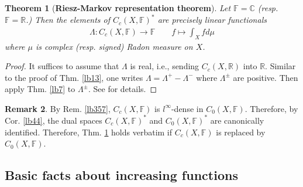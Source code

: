 \documentclass[12pt,b5paper,notitlepage]{article}
\theoremstyle{definition}
\newtheorem{df}{Definition}[subsection]
\newtheorem{rem}[df]{Remark}
\theoremstyle{plain}
\newtheorem{thm}[df]{Theorem}
\newcommand{\ovl}{\overline}
\newcommand{\Cbb}{\mathbb C}
\newcommand{\Rbb}{\mathbb R}
\newcommand{\Fbb}{\mathbb F}
\numberwithin{equation}{section}
\begin{document}
\begin{thm}[\textbf{Riesz-Markov representation theorem}] \label{lb8}
Let $\Fbb=\Cbb$ (resp. $\Fbb=\Rbb$.) Then the elements of $C_c(X,\Fbb)^*$ are precisely linear functionals
\begin{align*}
\Lambda:C_c(X,\Fbb)\rightarrow\Fbb \qquad f\mapsto \int_X fd\mu
\end{align*}
where $\mu$ is complex (resp. signed) Radon measure on $X$.
\end{thm}




\begin{proof}
It suffices to assume that $\Lambda$ is real, i.e., sending $C_c(X,\Rbb)$ into $\Rbb$. Similar to the proof of Thm. \ref{lb13}, one writes $\Lambda=\Lambda^+-\Lambda^-$ where $\Lambda^\pm$ are positive. Then apply Thm. \ref{lb7} to $\Lambda^\pm$. See \cite[Subsec. 25.10.2]{Gui-A} for details.
\end{proof}




\begin{rem}
By Rem. \ref{lb357}, $C_c(X,\Fbb)$ is $l^\infty$-dense in $C_0(X,\Fbb)$. Therefore, by Cor. \ref{lb44}, the dual spaces $C_c(X,\Fbb)^*$ and $C_0(X,\Fbb)^*$ are canonically identified. Therefore, Thm. \ref{lb8} holds verbatim if $C_c(X,\Fbb)$ is replaced by $C_0(X,\Fbb)$.  
\end{rem}


\begin{comment}
\begin{df}
Let $\mu$ be a complex Radon measure on $X$. Let $\Lambda\in C_c(X,\Fbb)^*=C_0(X,\Fbb)^*$ be the linear functional corresponding to $\mu$ as in Thm. \ref{lb8}. The \textbf{total variation} \pmb{$\Vert\mu\Vert$} \index{00@Total variation $\Vert\mu\Vert$} \index{zz@$\Vert\mu\Vert$, the total variation} is defined to be the operator norm of $\Lambda$, i.e.,
\begin{align*}
\Vert\mu\Vert=\Vert\Lambda\Vert=\sup_{f\in \ovl B_{C_c(X)}(0,1)}|\Lambda(f)|=\sup_{f\in \ovl B_{C_0(X)}(0,1)}|\Lambda(f)|
\end{align*}
\end{df}
\end{comment}





\subsection{Basic facts about increasing functions}\label{lb88}
\end{document}
